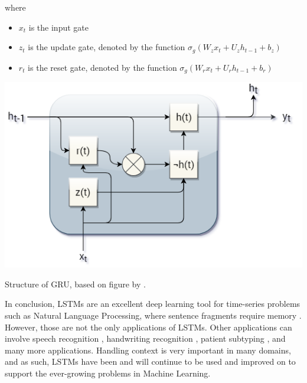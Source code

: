 where

\begin{itemize}
	\item {$x_{t}$} is the input gate
	\item {$z_{t}$} is the update gate, denoted by the function {$\sigma_{g}(W_{z}x_{t} + U_{z}h_{t-1} + b_{z})$}
	\item {$r_{t}$} is the reset gate, denoted by the function {$\sigma_{g}(W_{r}x_{t} + U_{r}h_{t-1} + b_{r})$}
\end{itemize}

\begin{marginfigure}
\centering
	\includegraphics[width=0.6\linewidth]{graphics/lstm/gru.png}
	\caption{
		Structure of GRU, based on figure by \citet{gruthithuhuong2016}.
	}
	\label{fig:gru}
\end{marginfigure}

In conclusion, LSTMs are an excellent deep learning tool for time-series problems such as Natural Language Processing, where sentence fragments require memory \citep{Graves:2006:CTC:1143844.1143891,Gers:2001:LRN:2325782.2326800,Schmidhuber:2005:EHN:1642293.1642430,Schafer:2006:LLT:2125268.2125278}. However, those are not the only applications of LSTMs. Other applications can involve speech recognition \citep{Saon:2017:RAC:3266800.3266802}, handwriting recognition \citep{Graves:2009:NCS:1525650.1525782}, patient subtyping \citep{Baytas:2017:PSV:3097983.3097997}, and many more applications. Handling context is very important in many domains, and as such, LSTMs have been and will continue to be used and improved on to support the ever-growing problems in Machine Learning.

